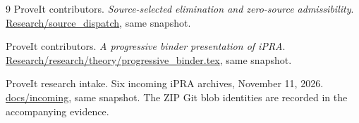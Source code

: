 \documentclass[11pt,a4paper]{article}
\theoremstyle{definition}
\begin{document}
\begin{thebibliography}{9}
ProveIt contributors.
\emph{Source-selected elimination and zero-source admissibility}.
\href{https://github.com/VladimirReshetnikov/ProveIt/tree/a4e5e96c456303cf231eab2aeeb3291d8889833f/Logic/PrimitiveRecursiveArithmetic/ConciseIPRA/Research/source_dispatch}{Research/source\_dispatch}, same snapshot.

ProveIt contributors.
\emph{A progressive binder presentation of iPRA}.
\href{https://github.com/VladimirReshetnikov/ProveIt/blob/a4e5e96c456303cf231eab2aeeb3291d8889833f/Logic/PrimitiveRecursiveArithmetic/ConciseIPRA/Research/research/theory/progressive_binder.tex}{Research/research/theory/progressive\_binder.tex}, same snapshot.

ProveIt research intake.
Six incoming iPRA archives, November 11, 2026.
\href{https://github.com/VladimirReshetnikov/ProveIt/tree/a4e5e96c456303cf231eab2aeeb3291d8889833f/Logic/PrimitiveRecursiveArithmetic/ConciseIPRA/docs/incoming}{docs/incoming}, same snapshot.
The ZIP Git blob identities are recorded in the accompanying evidence.
\end{thebibliography}

\end{document}
